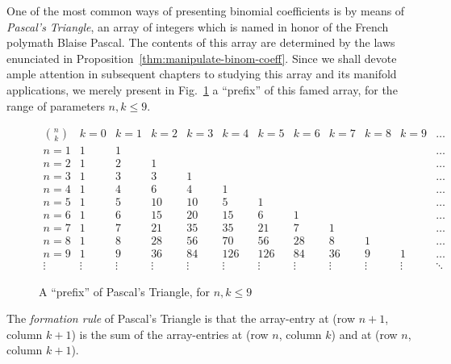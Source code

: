 One of the most common ways of presenting binomial coefficients is by means of {\it Pascal's Triangle}, an array of integers which is named in honor of the French polymath Blaise Pascal. The contents of this array are determined by the laws enunciated in Proposition~\ref{thm:manipulate-binom-coeff}.  Since we shall devote ample attention in subsequent chapters to studying this array and its manifold applications, we merely present in Fig.~\ref{fig:pascal-triangle} a ``prefix'' of this famed array, for the range of parameters $n,k \leq 9$.
\begin{figure}[ht]
\[
\begin{array}{c||r|r|r|r|r|r|r|r|r|r|r}
{\displaystyle {n \choose k}} & k=0 & k=1 & k=2 & k=3 & k=4 & k=5 &
k=6 & k=7 & k=8 & k=9 & \ldots \\
\hline
\hline
n=1 & 1 & 1 &    &    &     &     &    &    &   &   & \ldots \\
\hline
n=2 & 1 & 2 &  1 &    &     &     &    &    &   &   & \ldots \\
\hline
n=3 & 1 & 3 &  3 &  1 &     &     &    &    &   &   & \ldots \\
\hline
n=4 & 1 & 4 &  6 &  4 &   1 &     &    &    &   &   & \ldots \\
\hline
n=5 & 1 & 5 & 10 & 10 &   5 &   1 &    &    &   &   & \ldots \\
\hline
n=6 & 1 & 6 & 15 & 20 &  15 &   6 &  1 &    &   &   & \ldots \\
\hline
n=7 & 1 & 7 & 21 & 35 &  35 &  21 &  7 &  1 &   &   & \ldots \\
\hline
n=8 & 1 & 8 & 28 & 56 &  70 &  56 & 28 &  8 & 1 &   & \ldots \\
\hline
n=9 & 1 & 9 & 36 & 84 & 126 & 126 & 84 & 36 & 9 & 1 & \ldots \\
\hline
\vdots &\vdots &\vdots &\vdots &\vdots &\vdots &\vdots &\vdots &\vdots
&\vdots &\vdots &\ddots
\end{array}
\]
\caption{A ``prefix'' of Pascal's Triangle, for $n,k \leq 9$}
\label{fig:pascal-triangle}
\end{figure}
The {\em formation rule} of Pascal's Triangle is that the array-entry at (row $n+1$, column $k+1$) is the sum of the array-entries at (row $n$, column $k$) and at (row $n$, column $k+1$).


\bigskip

\noindent {}

